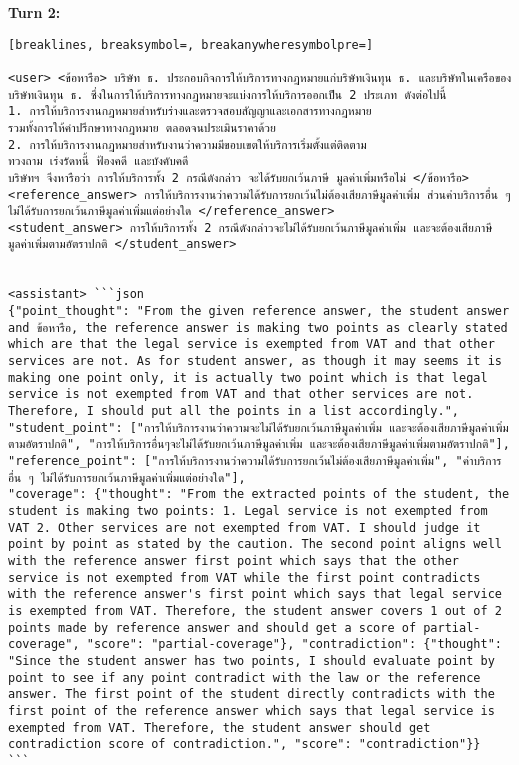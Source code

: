 \textbf{Turn 2: }
\begin{Verbatim}[breaklines, breaksymbol=, breakanywheresymbolpre=]

<user> <ข้อหารือ> บริษัท ธ. ประกอบกิจการให้บริการทางกฎหมายแก่บริษัทเงินทุน ธ. และบริษัทในเครือของ
บริษัทเงินทุน ธ. ซึ่งในการให้บริการทางกฎหมายจะแบ่งการให้บริการออกเป็น 2 ประเภท ดังต่อไปนี้
1. การให้บริการงานกฎหมายสำหรับร่างและตรวจสอบสัญญาและเอกสารทางกฎหมาย
รวมทั้งการให้คำปรึกษาทางกฎหมาย ตลอดจนประเมินราคาด้วย
2. การให้บริการงานกฎหมายสำหรับงานว่าความมีขอบเขตให้บริการเริ่มตั้งแต่ติดตาม
ทวงถาม เร่งรัดหนี้ ฟ้องคดี และบังคับคดี
บริษัทฯ จึงหารือว่า การให้บริการทั้ง 2 กรณีดังกล่าว จะได้รับยกเว้นภาษี มูลค่าเพิ่มหรือไม่ </ข้อหารือ>
<reference_answer> การให้บริการงานว่าความได้รับการยกเว้นไม่ต้องเสียภาษีมูลค่าเพิ่ม ส่วนค่าบริการอื่น ๆ ไม่ได้รับการยกเว้นภาษีมูลค่าเพิ่มแต่อย่างใด </reference_answer>
<student_answer> การให้บริการทั้ง 2 กรณีดังกล่าวจะไม่ได้รับยกเว้นภาษีมูลค่าเพิ่ม และจะต้องเสียภาษีมูลค่าเพิ่มตามอัตราปกติ </student_answer>


<assistant> ```json
{"point_thought": "From the given reference answer, the student answer and ข้อหารือ, the reference answer is making two points as clearly stated which are that the legal service is exempted from VAT and that other services are not. As for student answer, as though it may seems it is making one point only, it is actually two point which is that legal service is not exempted from VAT and that other services are not. Therefore, I should put all the points in a list accordingly.",
"student_point": ["การให้บริการงานว่าความจะไม่ได้รับยกเว้นภาษีมูลค่าเพิ่ม และจะต้องเสียภาษีมูลค่าเพิ่มตามอัตราปกติ", "การให้บริการอื่นๆจะไม่ได้รับยกเว้นภาษีมูลค่าเพิ่ม และจะต้องเสียภาษีมูลค่าเพิ่มตามอัตราปกติ"],
"reference_point": ["การให้บริการงานว่าความได้รับการยกเว้นไม่ต้องเสียภาษีมูลค่าเพิ่ม", "ค่าบริการอื่น ๆ ไม่ได้รับการยกเว้นภาษีมูลค่าเพิ่มแต่อย่างใด"],
"coverage": {"thought": "From the extracted points of the student, the student is making two points: 1. Legal service is not exempted from VAT 2. Other services are not exempted from VAT. I should judge it point by point as stated by the caution. The second point aligns well with the reference answer first point which says that the other service is not exempted from VAT while the first point contradicts with the reference answer's first point which says that legal service is exempted from VAT. Therefore, the student answer covers 1 out of 2 points made by reference answer and should get a score of partial-coverage", "score": "partial-coverage"}, "contradiction": {"thought": "Since the student answer has two points, I should evaluate point by point to see if any point contradict with the law or the reference answer. The first point of the student directly contradicts with the first point of the reference answer which says that legal service is exempted from VAT. Therefore, the student answer should get contradiction score of contradiction.", "score": "contradiction"}}
```
\end{Verbatim}

